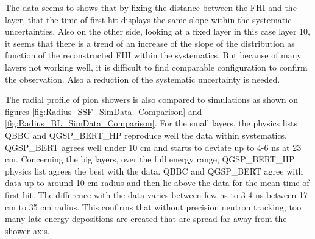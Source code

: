 The data seems to shows that by fixing the distance between the FHI and the layer, that the time of first hit displays the same slope within the systematic uncertainties. Also on the other side, looking at a fixed layer in this case layer 10, it seems that there is a trend of an increase of the slope of the distribution as function of the reconstructed FHI within the systematics. But because of many layers not working well, it is difficult to find comparable configuration to confirm the observation. Also a reduction of the systematic uncertainty is needed.

The radial profile of pion showers is also compared to simulations as shown on figures \ref{fig:Radius_SSF_SimData_Comparison} and \ref{fig:Radius_BL_SimData_Comparison}. For the small layers, the physics lists QBBC and QGSP\_BERT\_HP reproduce well the data within systematics. QGSP\_BERT agrees well under 10 cm and starts to deviate up to 4-6 ns at 23 cm. Concerning the big layers, over the full energy range, QGSP\_BERT\_HP physics list agrees the best with the data. QBBC and QGSP\_BERT agree with data up to around 10 cm radius and then lie above the data for the mean time of first hit. The difference with the data varies between few ns to 3-4 ns between 17 cm to 35 cm radius. This confirms that without precision neutron tracking, too many late energy depositions are created that are spread far away from the shower axis.

